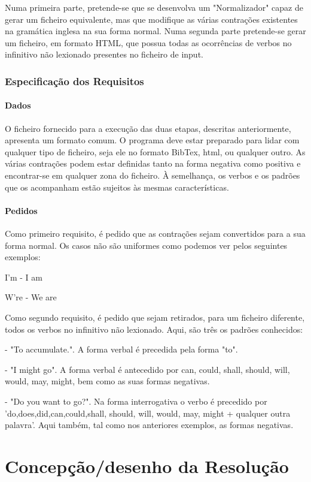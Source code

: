 \documentclass{report}
\begin{document}
Numa primeira parte, pretende-se que se desenvolva um "Normalizador" capaz de gerar um ficheiro equivalente, mas que modifique as várias contrações existentes na gramática inglesa na sua forma normal. Numa segunda parte pretende-se gerar um ficheiro, em formato HTML, que possua todas as ocorrências de verbos no infinitivo não lexionado presentes no ficheiro de input. 

\subsection{Especificação dos Requisitos}
\subsubsection{Dados}
O ficheiro fornecido para a execução das duas etapas, descritas anteriormente, apresenta um formato comum. O programa deve estar preparado para lidar com qualquer tipo de ficheiro, seja ele no formato BibTex, html, ou qualquer outro. As várias contrações podem estar definidas tanto na forma negativa como positiva e encontrar-se em qualquer zona do ficheiro. À semelhança, os verbos e os padrões que os acompanham estão sujeitos às mesmas características.

\subsubsection{Pedidos}
Como primeiro requisito, é pedido que as contrações sejam convertidos para a sua forma normal. Os casos não são uniformes como podemos ver pelos seguintes exemplos:\par
I'm - I am\par
W're - We are\par
Como segundo requisito, é pedido que sejam retirados, para um ficheiro diferente, todos os verbos no infinitivo não lexionado. Aqui, são três os padrões conhecidos:\par
- "To accumulate.". A forma verbal é precedida pela forma "to".\par
- "I might go". A forma verbal é antecedido por can, could, shall, should, will, would, may, might, bem como as suas formas negativas.\par
- "Do you want to go?". Na forma interrogativa o verbo é precedido por 'do,does,did,can,could,shall, should, will, would, may, might + qualquer outra palavra'. Aqui também, tal como nos anteriores exemplos, as formas negativas.


\chapter{Concepção/desenho da Resolução} \label{cd}
\end{document}
